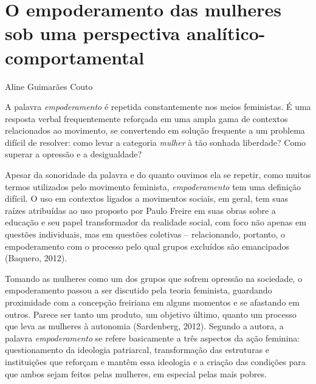 \setcounter{footnote}{0}
\setcounter{figure}{0}
\setcounter{table}{0}
\chapter*{O empoderamento das mulheres sob uma perspectiva analítico-comportamental}

\begin{flushright}
\begin{small}
    Aline Guimarães Couto
\end{small}
\vspace{1cm}
\end{flushright}

A palavra \textit{empoderamento} é repetida constantemente nos meios feministas. É uma resposta verbal frequentemente reforçada em uma ampla gama de contextos relacionados ao movimento, se convertendo em solução frequente a um problema difícil de resolver: como levar a categoria \textit{mulher} à tão sonhada liberdade? Como superar a opressão e a desigualdade?

Apesar da sonoridade da palavra e do quanto ouvimos ela se repetir, como muitos termos utilizados pelo movimento feminista, \textit{empoderamento} tem uma definição difícil. O uso em contextos ligados a movimentos sociais, em geral, tem suas raízes atribuídas ao uso proposto por Paulo Freire em suas obras sobre a educação e seu papel transformador da realidade social, com foco não apenas em questões individuais, mas em questões coletivas – relacionando, portanto, o empoderamento com o processo pelo qual grupos excluídos são emancipados (Baquero, 2012).

Tomando as mulheres como um dos grupos que sofrem opressão na sociedade, o empoderamento passou a ser discutido pela teoria feminista, guardando proximidade com a concepção freiriana em alguns momentos e se afastando em outros. Parece ser tanto um produto, um objetivo último, quanto um processo que leva as mulheres à autonomia (Sardenberg, 2012). Segundo a autora, a palavra \textit{empoderamento} se refere basicamente a três aspectos da ação feminina: questionamento da ideologia patriarcal, transformação das estruturas e instituições que reforçam e mantêm essa ideologia e a criação das condições para que ambos sejam feitos pelas mulheres, em especial pelas mais pobres. 

